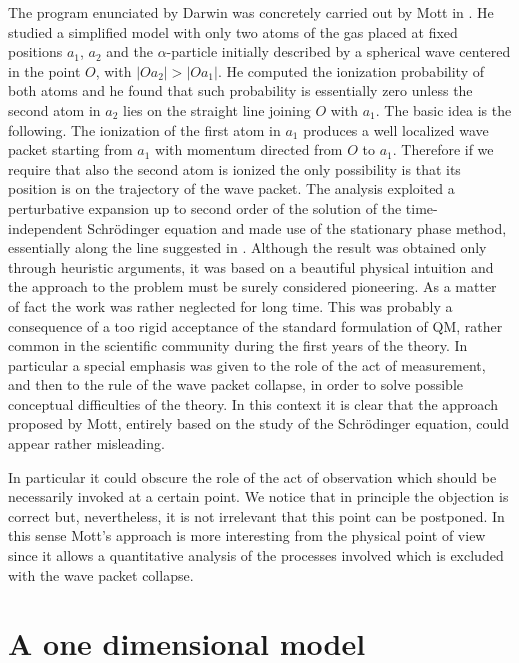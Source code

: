 \documentclass[12pt,reqno]{amsart}
\newcommand{\n}{\relax}
\newcommand{\vs}{\vspace{0.5cm}}
\numberwithin{equation}{section}
\begin{document}
\n
The program enunciated by Darwin was concretely carried out by Mott in \cite{m}. He studied a simplified model with only two atoms of the gas placed at fixed positions $a_1$, $a_2$  and the $\alpha$-particle initially described by a spherical wave centered in the point $O$, with $|Oa_2| >|Oa_1|$. He computed the ionization probability of both atoms  and he found that such probability is essentially zero unless the second atom in $a_2$ lies on the straight line joining $O$ with $a_1$.  The basic idea is the following.  The ionization of the first atom in $a_1$ produces a well localized wave packet starting from $a_1$ with momentum directed from $O$ to $a_1$. Therefore if we require that also the second atom is ionized the only possibility is that its position is on the trajectory of the wave packet.  
The analysis exploited a perturbative expansion up to second order of the solution of  the time-independent Schr\"{o}dinger equation and made use of the stationary phase method, essentially along the line suggested in \cite{d}. 
Although the result was obtained only through heuristic arguments,  it was based  on a beautiful physical intuition and the approach to the problem must be surely considered pioneering.  As a matter of fact the work was rather neglected for long time.  This was  probably a consequence of a too rigid acceptance of the standard formulation of QM, rather common in the scientific community during the first years of the theory.  In  particular a special emphasis   was given to the role of the act of measurement, and then to the rule of the wave packet collapse, in order to solve possible conceptual difficulties of the theory.  In this context it is clear that the approach proposed by Mott, entirely based on the study of the Schr\"{o}dinger equation,  could appear rather misleading.

\n
In particular it could obscure the role of the act of observation which should be necessarily invoked at a certain point. We notice that in principle the objection is correct but, nevertheless, it is not irrelevant that this point can be postponed. In this sense  Mott's approach is  more interesting from the physical point of view since it allows a quantitative analysis of the processes involved which is excluded with the wave packet collapse. 




\vs
\vs
\section{A one dimensional model}
\end{document}

